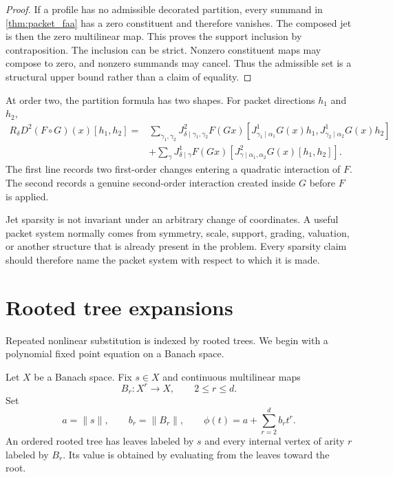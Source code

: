 \begin{proof}
If a profile has no admissible decorated partition, every summand in \cref{thm:packet_faa} has a zero constituent and therefore vanishes. The composed jet is then the zero multilinear map. This proves the support inclusion by contraposition. The inclusion can be strict. Nonzero constituent maps may compose to zero, and nonzero summands may cancel. Thus the admissible set is a structural upper bound rather than a claim of equality.
\end{proof}


\begin{example}\label{ex:second_order_composition}
At order two, the partition formula has two shapes.  For packet directions $h_1$ and $h_2$,
\[
\begin{aligned}
R_\delta D^2(F\circ G)(x)[h_1,h_2]
={}&
\sum_{\gamma_1,\gamma_2}
J^2_{\delta\mid\gamma_1,\gamma_2}F(Gx)
[J^1_{\gamma_1\mid\alpha_1}G(x)h_1,J^1_{\gamma_2\mid\alpha_2}G(x)h_2]\\
&+
\sum_\gamma
J^1_{\delta\mid\gamma}F(Gx)
[J^2_{\gamma\mid\alpha_1,\alpha_2}G(x)[h_1,h_2]].
\end{aligned}
\]
The first line records two first-order changes entering a quadratic interaction of $F$.  The second records a genuine second-order interaction created inside $G$ before $F$ is applied.
\end{example}

\begin{remark}\label{rem:jet_coordinate_dependence}
Jet sparsity is not invariant under an arbitrary change of coordinates.  A useful packet system normally comes from symmetry, scale, support, grading, valuation, or another structure that is already present in the problem.  Every sparsity claim should therefore name the packet system with respect to which it is made.
\end{remark}

\section{Rooted tree expansions}\label{sec:trees}

Repeated nonlinear substitution is indexed by rooted trees.  We begin with a polynomial fixed point equation on a Banach space.

Let $X$ be a Banach space.  Fix $s\in X$ and continuous multilinear maps
\[
B_r:X^r\longrightarrow X,
\qquad
2\le r\le d.
\]
Set
\[
a=\|s\|,
\qquad
b_r=\|B_r\|,
\qquad
\phi(t)=a+\sum_{r=2}^{d}b_rt^r.
\]
An ordered rooted tree has leaves labeled by $s$ and every internal vertex of arity $r$ labeled by $B_r$.  Its value is obtained by evaluating from the leaves toward the root.

